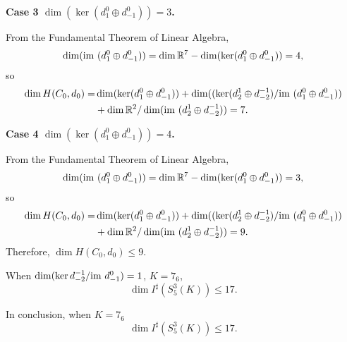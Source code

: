 \documentclass{amsart}
\theoremstyle{definition}
\newcommand{\im}{{\rm im~}}
\begin{document}
\textbf{Case 3 $\dim(\ker (d^0_1\oplus d^0_{-1}))= 3$.}

From the Fundamental Theorem of Linear Algebra,
$$\dim(\im (d^0_1\oplus d^0_{-1}))= \dim \mathbb{R}^7-\dim(\ker (d^0_1\oplus d^0_{-1}))=4,$$
so
\begin{equation*}
    \begin{aligned}
       \dim H(C_0,d_0)= 
        &\dim(\ker (d^0_1\oplus d^0_{-1}))
        +
        \dim((\ker (d^1_2\oplus d^{-1}_{-2})/\im(d^0_1\oplus d^0_{-1}))\\
        &+
        \dim \mathbb{R}^2/\dim (\im (d^1_2 \oplus d^{-1}_{-2}))
        =7.
    \end{aligned}
\end{equation*}

\textbf{Case 4 $\dim(\ker (d^0_1\oplus d^0_{-1}))= 4$.}

From the Fundamental Theorem of Linear Algebra,
$$\dim(\im (d^0_1\oplus d^0_{-1}))= \dim \mathbb{R}^7-\dim(\ker (d^0_1\oplus d^0_{-1}))=3,$$
so
\begin{equation*}
    \begin{aligned}
       \dim H(C_0,d_0)= 
        &\dim(\ker (d^0_1\oplus d^0_{-1}))
        +
        \dim((\ker (d^1_2\oplus d^{-1}_{-2})/\im(d^0_1\oplus d^0_{-1}))\\
        &+
        \dim \mathbb{R}^2/\dim (\im (d^1_2 \oplus d^{-1}_{-2}))
        =9.
    \end{aligned}
\end{equation*}
Therefore,
$\dim H(C_0,d_0)\leq 9$.

When
$\dim (\ker d^{-1}_{-2}\slash \im d^0_{-1})=1$, $K=7_6$,
$$\dim I^{\sharp}(S^3_{5}(K))\leq 17.$$

\bigskip
In conclusion, when $K=7_6$ 
$$\dim I^{\sharp}(S^3_{5}(K))\leq17.$$

 



\end{document}
